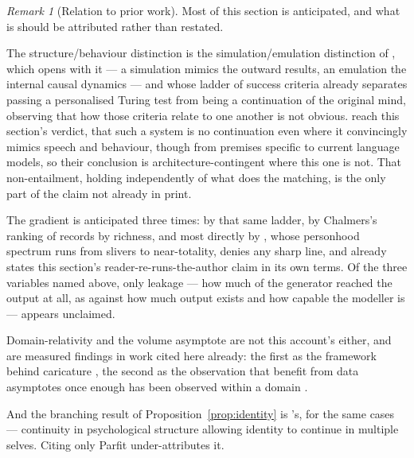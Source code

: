 \documentclass[11pt,a4paper]{article}
\theoremstyle{remark}\newtheorem{remark}[definition]{Remark}
\begin{document}
\begin{remark}[Relation to prior work]\label{rem:death-prior}
Most of this section is anticipated, and what is should be attributed rather than restated.

The structure/behaviour distinction is the simulation/emulation distinction of \citet{sandberg2008},
which opens with it --- a simulation mimics the outward results, an emulation the internal causal
dynamics --- and whose ladder of success criteria already separates passing a personalised Turing test
from being a continuation of the original mind, observing that how those criteria relate to one
another is not obvious. \citet{campbell2025} reach this section's verdict, that such a system is no
continuation even where it convincingly mimics speech and behaviour, though from premises specific to
current language models, so their conclusion is architecture-contingent where this one is not. That
non-entailment, holding independently of what does the matching, is the only part of the claim not
already in print.

The gradient is anticipated three times: by that same ladder, by Chalmers's ranking of records by
richness, and most directly by \citet{karpus2025}, whose personhood spectrum runs from slivers to
near-totality, denies any sharp line, and already states this section's reader-re-runs-the-author
claim in its own terms. Of the three variables named above, only leakage --- how much of the generator
reached the output at all, as against how much output exists and how capable the modeller is ---
appears unclaimed.

Domain-relativity and the volume asymptote are not this account's either, and are measured findings in
work cited here already: the first as the framework behind caricature \citep{cheng2023}, the second as
the observation that benefit from data asymptotes once enough has been observed within a domain
\citep{park2024}.

And the branching result of Proposition~\ref{prop:identity} is \citet{cerullo2015}'s, for the same
cases --- continuity in psychological structure allowing identity to continue in multiple selves.
Citing only Parfit under-attributes it.
\end{remark}
\end{document}
